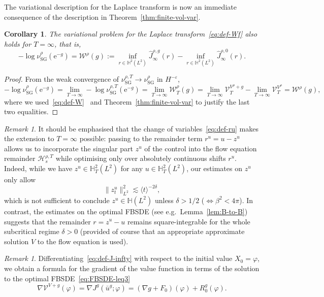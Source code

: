 \documentclass[11pt, a4paper]{scrartcl}
\numberwithin{equation}{section}
\theoremstyle{plain}
\newtheorem{corollary}[foo]{Corollary}
\theoremstyle{remark}
\newtheorem{remark}[foo]{Remark}
\newcommand{\assign}{:=}
\newcommand{\mathe}{\mathrm{e}}
\newcommand{\tmop}[1]{\ensuremath{\operatorname{#1}}}
\begin{document}
The variational description for the Laplace transform is now an immediate
consequence of the description in Theorem~\ref{thm:finite-vol-var}.

\begin{corollary}
  The variational problem for the Laplace transform~\eqref{eq:def-Wf} also
  holds for $T = \infty$, that is,
  \[ - \log \nu_{\tmop{SG}}^{\rho} (\mathe^{- g}) = \mathcal{W}^{\rho} (g)
     \assign \inf_{r \in \mathbb{H}^2 (L^2)}  \hat{J}_{\infty}^{\rho, g} (r) -
     \inf_{r \in \mathbb{H}^2 (L^2)}  \hat{J}_{\infty}^{\rho, 0} (r) . \]
\end{corollary}

\begin{proof}
  From the weak convergence of $\nu_{\tmop{SG}}^{\rho, T} \rightarrow
  \nu_{\tmop{SG}}^{\rho}$ in $H^{- \varepsilon}$,
  {\small{\[ - \log \nu_{\tmop{SG}}^{\rho} (\mathe^{- g}) = \lim_{T \rightarrow
     \infty} - \log \nu_{\tmop{SG}}^{\rho, T} (\mathe^{- g}) = \lim_{T
     \rightarrow \infty}  \mathcal{W}_T^{\rho} (g) = \lim_{T \rightarrow
     \infty}  \mathcal{V}_T^{V^{\rho} + g} - \lim_{T \rightarrow \infty} 
     \mathcal{V}_T^{V^{\rho}} = \mathcal{W}^{\rho} (g) , \]}}
  where we used~\eqref{eq:def-W} \ and Theorem~\ref{thm:finite-vol-var} to
  justify the last two equalities.
\end{proof}

\begin{remark}
  It should be emphasised that the change of variables~\eqref{eq:def-ru} makes
  the extension to $T = \infty$ possible: passing to the remainder term $r^u =
  u - z^u$ allows us to incorporate the singular part $z^u$ of the control
  into the flow equation remainder $\mathcal{H}^{\rho, T}_s$ while optimising
  only over absolutely continuous shifts $r^u$. Indeed, while we have $z^u \in
  \mathbb{H}_T^2 (L^2)$ for any $u \in \mathbb{H}_T^2 (L^2)$, our estimates on
  $z^u$ only allow
  \[ \| z^u_t \|_{L^2}^2 \lesssim \langle t \rangle^{- 2 \delta}, \]
  which is not sufficient to conclude $z^u \in \mathbb{H} (L^2)$ unless
  $\delta > 1 / 2$ ($\Leftrightarrow \beta^2 < 4 \pi$). In contrast, the
  estimates on the optimal FBSDE (see e.g.~Lemma~\ref{lem:B-to-B}) suggests
  that the remainder $r=z^u-u$ remains square-integrable for the whole
  subcritical regime $\delta > 0$ (provided of course that an appropriate
  approximate solution $V$ to the flow equation is used).
\end{remark}

\begin{remark}
  \label{rem:gradJ=R}Differentiating~\eqref{eq:def-J-infty} with respect to
  the initial value $X_0 = \varphi$, we obtain a formula for the gradient of
  the value function in terms of the solution to the optimal
  FBSDE~\eqref{eq:FBSDE-leq3}
  \begin{equation}
    \nabla \mathcal{V}^{V + g} (\varphi) = \nabla J^g (\bar{u}^g ; \varphi) =
    (\nabla g + F_0) (\varphi) + R^g_0 (\varphi) . \label{eq:gradV=F+R}
  \end{equation}
\end{remark}
\end{document}
